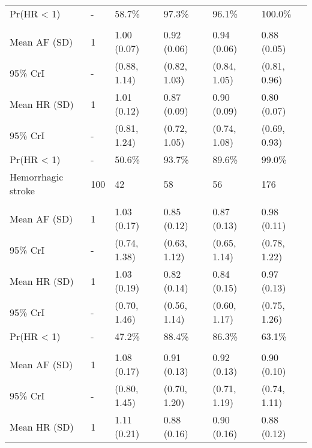 \documentclass[nutrients,article,accept,moreauthors,pdftex]{Definitions/mdpi}
\begin{document}
\begin{table}[H]
{\begin{tabular}{L{32mm}C{8mm}C{26mm}C{25mm}C{25mm}C{20mm}}
   \hspace{1em}Pr(HR < 1) & - & 58.7\% & 97.3\% & 96.1\% & 100.0\%\\
\addlinespace[0.3em]
\\
\hspace{1em}Mean AF (SD) & 1 & 1.00 (0.07) & 0.92 (0.06) & 0.94 (0.06) & 0.88 (0.05)\\
   \hspace{1em}95\% CrI & - & (0.88, 1.14) & (0.82, 1.03) & (0.84, 1.05) & (0.81, 0.96)\\
\hspace{1em}Mean HR (SD) & 1 & 1.01 (0.12) & 0.87 (0.09) & 0.90 (0.09) & 0.80 (0.07)\\
   \hspace{1em}95\% CrI & - & (0.81, 1.24) & (0.72, 1.05) & (0.74, 1.08) & (0.69, 0.93)\\
\hspace{1em}Pr(HR < 1) & - & 50.6\% & 93.7\% & 89.6\% & 99.0\%\\
\hline
   Hemorrhagic stroke & 100 & 42 & 58 & 56 & 176\\
\addlinespace[0.3em]
\\
\hspace{1em}Mean AF (SD) & 1 & 1.03 (0.17) & 0.85 (0.12) & 0.87 (0.13) & 0.98 (0.11)\\
   \hspace{1em}95\% CrI & - & (0.74, 1.38) & (0.63, 1.12) & (0.65, 1.14) & (0.78, 1.22)\\
\hspace{1em}Mean HR (SD) & 1 & 1.03 (0.19) & 0.82 (0.14) & 0.84 (0.15) & 0.97 (0.13)\\
   \hspace{1em}95\% CrI & - & (0.70, 1.46) & (0.56, 1.14) & (0.60, 1.17) & (0.75, 1.26)\\
\hspace{1em}Pr(HR < 1) & - & 47.2\% & 88.4\% & 86.3\% & 63.1\%\\
\addlinespace[0.3em]
\\
   \hspace{1em}Mean AF (SD) & 1 & 1.08 (0.17) & 0.91 (0.13) & 0.92 (0.13) & 0.90 (0.10)\\
\hspace{1em}95\% CrI & - & (0.80, 1.45) & (0.70, 1.20) & (0.71, 1.19) & (0.74, 1.11)\\
   \hspace{1em}Mean HR (SD) & 1 & 1.11 (0.21) & 0.88 (0.16) & 0.90 (0.16) & 0.88 (0.12)\\

\end{tabular}}
\end{table}
\end{document}
